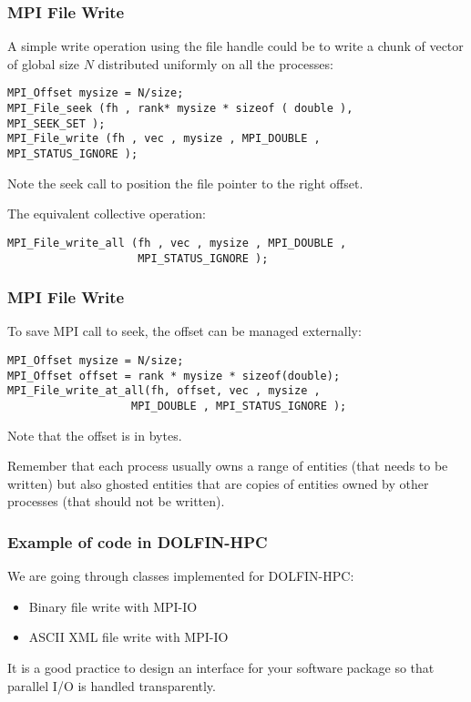\begin{frame}[fragile]
\frametitle{MPI File Write}

A simple write operation using the file handle could be to write a chunk of vector of global size $N$ distributed uniformly on all the processes:
{\small
\begin{lstlisting}[style=c]
MPI_Offset mysize = N/size;
MPI_File_seek (fh , rank* mysize * sizeof ( double ),
MPI_SEEK_SET );
MPI_File_write (fh , vec , mysize , MPI_DOUBLE ,
MPI_STATUS_IGNORE );
\end{lstlisting}

\medskip
Note the seek call to position the file pointer to the right offset.

\medskip
The equivalent collective operation:
\begin{lstlisting}[style=c]
MPI_File_write_all (fh , vec , mysize , MPI_DOUBLE ,
                    MPI_STATUS_IGNORE );
\end{lstlisting}
}
\end{frame}

\begin{frame}[fragile]
\frametitle{MPI File Write}

To save MPI call to seek, the offset can be managed externally:
\begin{lstlisting}[style=c]
MPI_Offset mysize = N/size;
MPI_Offset offset = rank * mysize * sizeof(double);
MPI_File_write_at_all(fh, offset, vec , mysize ,
                   MPI_DOUBLE , MPI_STATUS_IGNORE );
\end{lstlisting}
Note that the offset is in bytes.

\medskip
Remember that each process usually owns a range of entities (that needs to be written) but also ghosted entities that are copies of entities owned by other processes (that should not be written).

\end{frame}

\begin{frame}[fragile]
\frametitle{Example of code in DOLFIN-HPC}

We are going through classes implemented for DOLFIN-HPC:
\begin{itemize}
\item Binary file write with MPI-IO
\item ASCII XML file write with MPI-IO
\end{itemize}

\medskip
It is a good practice to design an interface for your software package so that parallel I/O is handled transparently.

\end{frame}

